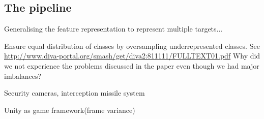 \subsection{The pipeline}




Generalising the feature representation to represent multiple targets...

Ensure equal distribution of classes by oversampling underrepresented classes. See \url{http://www.diva-portal.org/smash/get/diva2:811111/FULLTEXT01.pdf} Why did we not experience the problems discussed in the paper even though we had major imbalances?

Security cameras, interception missile system

Unity as game framework(frame variance)
